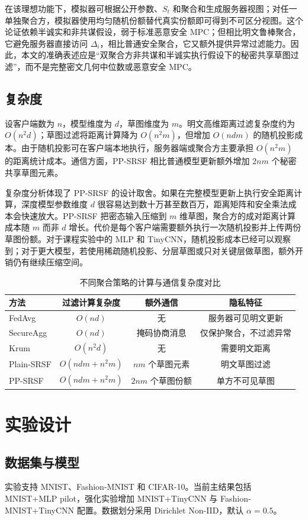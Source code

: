 \documentclass[final]{jcr}
\begin{document}
在该理想功能下，模拟器可根据公开参数、$S_t$ 和聚合和生成服务器视图；对任一单独聚合方，模拟器使用均匀随机份额替代真实份额即可得到不可区分视图。这个论证依赖半诚实和非共谋假设，弱于标准恶意安全 MPC；但相比明文鲁棒聚合，它避免服务器直接访问 $\Delta_i$，相比普通安全聚合，它又额外提供异常过滤能力。因此，本文的准确表述应是“双聚合方非共谋和半诚实执行假设下的秘密共享草图过滤”，而不是完整密文几何中位数或恶意安全 MPC。

\subsection{复杂度}
设客户端数为 $n$，模型维度为 $d$，草图维度为 $m$。明文高维距离过滤复杂度约为 $O(n^2d)$；草图过滤将距离计算降为 $O(n^2m)$，但增加 $O(ndm)$ 的随机投影成本。由于随机投影可在客户端本地执行，服务器端或聚合方主要承担 $O(n^2m)$ 的距离统计成本。通信方面，PP-SRSF 相比普通模型更新额外增加 $2nm$ 个秘密共享草图元素。

复杂度分析体现了 PP-SRSF 的设计取舍。如果在完整模型更新上执行安全距离计算，深度模型参数维度 $d$ 很容易达到数十万甚至数百万，距离矩阵和安全乘法成本会快速放大。PP-SRSF 把密态输入压缩到 $m$ 维草图，聚合方的成对距离计算成本随 $m$ 而非 $d$ 增长。代价是每个客户端需要额外执行一次随机投影并上传两份草图份额。对于课程实验中的 MLP 和 TinyCNN，随机投影成本已经可以观察到；对于更大模型，若使用稀疏随机投影、分层草图或只对关键层做草图，额外开销仍有继续压缩空间。

\begin{table}
\centering
\caption{不同聚合策略的计算与通信复杂度对比}{}
\label{tab:complexity}
\begin{tabular}{lccc}
\toprule
方法 & 过滤计算复杂度 & 额外通信 & 隐私特征\\
\midrule
FedAvg & $O(nd)$ & 无 & 服务器可见明文更新\\
SecureAgg & $O(nd)$ & 掩码协商消息 & 仅保护聚合，不过滤异常\\
Krum & $O(n^2d)$ & 无 & 需要明文距离\\
Plain-SRSF & $O(ndm+n^2m)$ & $nm$ 个草图元素 & 明文草图过滤\\
PP-SRSF & $O(ndm+n^2m)$ & $2nm$ 个草图份额 & 单方不可见草图\\
\bottomrule
\end{tabular}
\end{table}

\section{实验设计}
\subsection{数据集与模型}
实验支持 MNIST、Fashion-MNIST 和 CIFAR-10。当前主结果包括 MNIST+MLP pilot，强化实验增加 MNIST+TinyCNN 与 Fashion-MNIST+TinyCNN 配置。数据划分采用 Dirichlet Non-IID，默认 $\alpha=0.5$。
\end{document}
